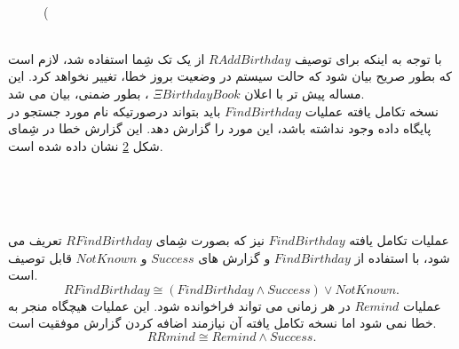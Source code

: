 \begin{figure}
\centering
\begin{schema}{}
 \Delta {}\\
 \\
 \\
\ST
{}\\
 \wedge \\
 \\
 (\\
 \\
\end{schema}
\caption{}
\label{RAddBirthday}
\end{figure}
با توجه به اینکه برای توصیف 
$\mathit{RAddBirthday}$
از یک تک شِما استفاده شد، لازم است که بطور صریح بیان شود که حالت سیستم در وضعیت بروز خطا، تغییر نخواهد کرد. این مساله پیش تر با اعلان
$\Xi \mathit{BirthdayBook}$
، بطور ضمنی، بیان می شد.
\\
نسخه تکامل یافته عملیات 
$\mathit{FindBirthday}$
باید بتواند درصورتیکه نام مورد جستجو در پایگاه داده وجود نداشته باشد، این مورد را گزارش دهد. این گزارش خطا در شِمای شکل 
\ref{NotKnown}
نشان داده شده است. 

\begin{figure}
\centering
\begin{schema}{}
 \Xi{}\\
 \\
\ST
{}\\
\end{schema}
\caption{}
\label{NotKnown}
\end{figure} 
عملیات تکامل یافته
$\mathit{FindBirthday}$
نیز که بصورت شِمای 
$\mathit{RFindBirthday}$
تعریف می شود، با استفاده از 
$\mathit{FindBirthday}$
و گزارش های 
$\mathit{Success}$
و 
$\mathit{NotKnown}$
قابل توصیف است.
\[
\mathit{RFindBirthday \cong (FindBirthday \wedge Success) \vee NotKnown.}
\]
عملیات 
$\mathit{Remind}$
در هر زمانی می تواند فراخوانده شود. این عملیات هیچگاه منجر به خطا نمی شود اما نسخه تکامل یافته آن نیازمند اضافه کردن گزارش موفقیت است.
\[
\mathit{RRmind \cong Remind \wedge Success.}
\] 

